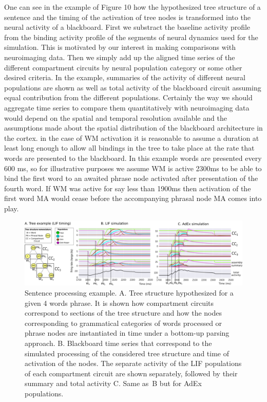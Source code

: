 \documentclass[10pt]{article}
\begin{document}
One can see in the example of Figure 10 how the hypothesized tree
structure of a sentence and the timing of the activation of tree nodes
is transformed into the neural activity of a blackboard. First we
substract the baseline activity profile from the binding activity
profile of the segments of neural dynamics used for the simulation.
This is motivated by our interest in making comparisons with
neuroimaging data. Then we simply add up the aligned time series of
the different compartment circuits by neural population category or
some other desired criteria. In the example, summaries of the activity
of different neural populations are shown as well as total activity of
the blackboard circuit assuming equal contribution from the different
populations. Certainly the way we should aggregate time series to
compare them quantitatively with neuroimaging data would depend on the
spatial and temporal resolution available and the assumptions made
about the spatial distribution of the blackboard architecture in the
cortex. in the case of WM activation it is reasonable to assume a
duration at least long enough to allow all bindings in the tree to
take place at the rate that words are presented to the blackboard. In
this example words are presented every 600 ms, so for illustrative
purposes we assume WM is active 2300ms to be able to bind the first
word to an awaited phrase node activated after presentation of the
fourth word. If WM was active for say less than 1900ms then activation
of the first word MA would cease before the accompanying phrasal node
MA comes into play.

\begin{figure}[h!]
  \begin{center}
    \includegraphics[width=1.00\columnwidth]{figures/compartments_tree_example/compartments_tree_example}
    \caption{Sentence processing example. A. Tree
        structure hypothesized for a given 4 words phrase. It is shown
        how compartment circuits correspond to sections of the tree
        structure and how the nodes corresponding to grammatical
        categories of words processed or phrase nodes are instantiated
        in time under a bottom-up parsing approach. B. Blackboard time
        series that correspond to the simulated processing of the
        considered tree structure and time of activation of the nodes.
        The separate activity of the LIF populations of each
        compartment circuit are shown separately, followed by their
        summary and total activity C. Same as~B but for AdEx
        populations. {\label{679921}}%
      }
  \end{center}
\end{figure}
\end{document}
